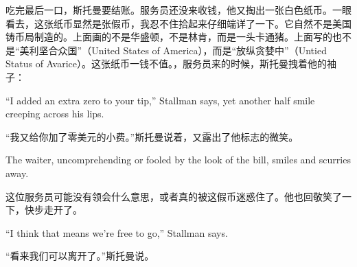 \ifdefined\chs
吃完最后一口，斯托曼要结账。服务员还没来收钱，他又掏出一张白色纸币。一眼看去，这张纸币显然是张假币，我忍不住拾起来仔细端详了一下。它自然不是美国铸币局制造的。上面画的不是华盛顿，不是林肯\ifdefined\spv ，而是一头卡通猪。上面写的也不是``美利坚合众国''（United States of America），而是``放纵贪婪中''（Untied Status of Avarice）\fi 。这张纸币一钱不值\ifdefined\vtwo {}。\fi ，服务员来的时候，斯托曼拽着他的袖子：
\fi

\ifdefined\eng
``I added an extra zero to your tip,'' Stallman says, yet another half smile creeping across his lips.
\fi

\ifdefined\chs
``我又给你加了零美元的小费。''斯托曼说着，又露出了他标志的微笑。
\fi

\ifdefined\eng
The waiter, uncomprehending or fooled by the look of the bill, smiles and scurries away.
\fi

\ifdefined\chs
这位服务员可能没有领会什么意思，或者真的被这假币迷惑住了。他也回敬笑了一下，快步走开了。
\fi

\ifdefined\eng
``I think that means we're free to go,'' Stallman says.
\fi

\ifdefined\chs
``看来我们可以离开了。''斯托曼说。
\fi

\theendnotes
\setcounter{endnote}{0}
